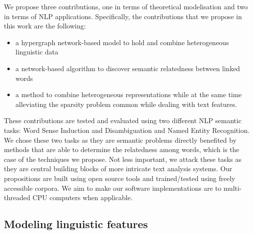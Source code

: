We propose three contributions, one in terms of theoretical modelisation and two in terms of NLP applications. Specifically, the contributions that we propose in this work are the following:
\begin{itemize}
\item a hypergraph network-based model to hold and combine heterogeneous linguistic data %
\item a network-based algorithm to discover semantic relatedness between linked words
\item a method to combine heterogeneous representations while at the same time alleviating the sparsity problem common while dealing with text features.
\end{itemize}
These contributions are tested and evaluated using two different NLP semantic tasks: Word Sense Induction and Disambiguation and Named Entity Recognition. We chose these two tasks as they are semantic problems directly benefited by methods  that are able to determine the relatedness among words, which is the case of the techniques we propose. Not less important, we attack these tasks as they are central building blocks of more intricate text analysis systems. Our propositions are built using open source tools and trained/tested using freely accessible corpora. We aim to make our software implementations are  to multi-threaded CPU computers when applicable.


\subsection{Modeling linguistic features}
